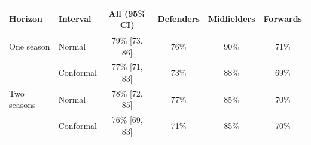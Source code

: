 \begin{tabular}{llcccc}
\toprule
Horizon & Interval & All (95\% CI) & Defenders & Midfielders & Forwards \\
\midrule
One season & Normal & 79\% [73, 86] & 76\% & 90\% & 71\% \\
 & Conformal & 77\% [71, 83] & 73\% & 88\% & 69\% \\
Two seasons & Normal & 78\% [72, 85] & 77\% & 85\% & 70\% \\
 & Conformal & 76\% [69, 83] & 71\% & 85\% & 70\% \\
\bottomrule
\end{tabular}
